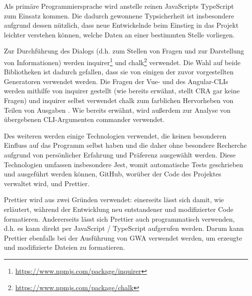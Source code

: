 Als primäre Programmiersprache wird anstelle reinen JavaScripts TypeScript zum Einsatz kommen. Die dadurch gewonnene Typsicherheit ist insbesondere aufgrund dessen nützlich, dass neue Entwickelnde beim Einstieg in das Projekt leichter verstehen können, welche Daten an einer bestimmten Stelle vorliegen.

Zur Durchführung des Dialogs (d.h. zum Stellen von Fragen und zur Darstellung von Informationen) werden inquirer\footnote{\url{https://www.npmjs.com/package/inquirer}} und chalk\footnote{\url{https://www.npmjs.com/package/chalk}} verwendet. Die Wahl auf beide Bibliotheken ist dadurch gefallen, dass sie von einigen der zuvor vorgestellten Generatoren verwendet werden. Die Fragen der Vue- und des Angular-\gls{CLI}s werden mithilfe von inquirer gestellt \cite{vue_cli_uses_inquirer} \cite{angular_cli_uses_inquirer} (wie bereits erwähnt, stellt \gls{CRA} gar keine Fragen) und inquirer selbst verwendet chalk zum farblichen Hervorheben von Teilen von Ausgaben \cite{inquirer_uses_chalk}. Wie bereits erwähnt, wird außerdem zur Analyse von übergebenen \gls{CLI}-Argumenten commander verwendet.

Des weiteren werden einige Technologien verwendet, die keinen besonderen Einfluss auf das Programm selbst haben und die daher ohne besondere Recherche aufgrund von persönlicher Erfahrung und Präferenz ausgewählt werden. Diese Technologien umfassen insbesondere Jest, womit automatische Tests geschrieben und ausgeführt werden können, GitHub, worüber der Code des Projektes verwaltet wird, und Prettier.

Prettier wird aus zwei Gründen verwendet: einerseits lässt sich damit, wie erläutert, während der Entwicklung neu entstandener und modifizierter Code formatieren. Andererseits lässt sich Prettier auch programmatisch verwenden, d.h. es kann direkt per JavaScript / TypeScript aufgerufen werden. Darum kann Prettier ebenfalls bei der Ausführung von \gls{GWA} verwendet werden, um erzeugte und modifizierte Dateien zu formatieren.
